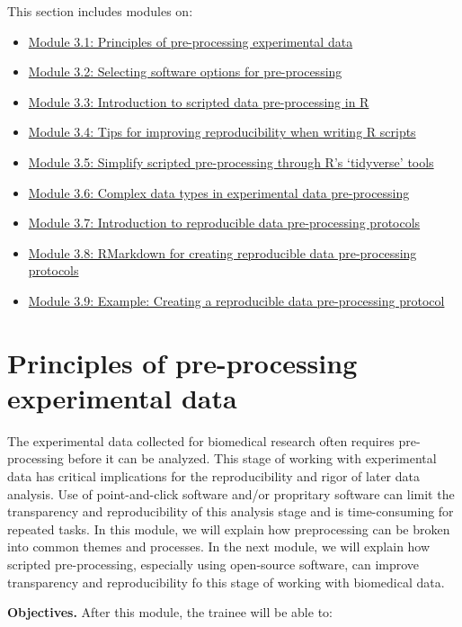 \documentclass[]{tufte-book}
\providecommand{\tightlist}{%
  \setlength{\itemsep}{0pt}\setlength{\parskip}{0pt}}
\begin{document}
This section includes modules on:

\begin{itemize}
\tightlist
\item
  \hyperref[module12]{Module 3.1: Principles of pre-processing experimental data}
\item
  \hyperref[module12a]{Module 3.2: Selecting software options for pre-processing}
\item
  \hyperref[module13]{Module 3.3: Introduction to scripted data pre-processing in R}
\item
  \hyperref[module13a]{Module 3.4: Tips for improving reproducibility when writing R scripts}
\item
  \hyperref[module14]{Module 3.5: Simplify scripted pre-processing through R's `tidyverse' tools}
\item
  \hyperref[module15]{Module 3.6: Complex data types in experimental data pre-processing}
\item
  \hyperref[module18]{Module 3.7: Introduction to reproducible data pre-processing protocols}
\item
  \hyperref[module19]{Module 3.8: RMarkdown for creating reproducible data pre-processing protocols}
\item
  \hyperref[module20]{Module 3.9: Example: Creating a reproducible data pre-processing protocol}
\end{itemize}

\section{Principles of pre-processing experimental data}\label{module12}

The experimental data collected for biomedical research often requires
pre-processing before it can be analyzed. This stage of working with
experimental data has critical implications for the reproducibility and rigor of
later data analysis. Use of point-and-click software and/or propritary software
can limit the transparency and reproducibility of this analysis stage and is
time-consuming for repeated tasks. In this module, we will explain how
preprocessing can be broken into common themes and processes. In the next
module, we will explain how scripted pre-processing, especially using
open-source software, can improve transparency and reproducibility fo this stage
of working with biomedical data.

\textbf{Objectives.} After this module, the trainee will be able to:
\end{document}
